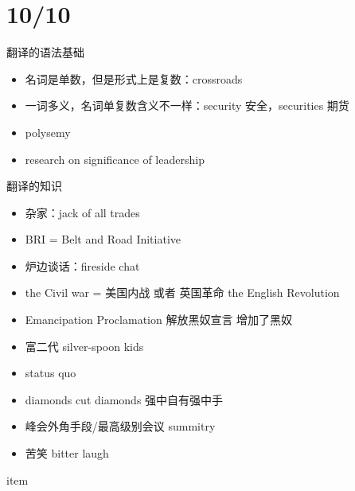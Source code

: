 \documentclass{ctexart}
\begin{document}
\section{10/10}
翻译的语法基础
\begin{itemize}
  \item 名词是单数，但是形式上是复数：crossroads 
  \item 一词多义，名词单复数含义不一样：security 安全，securities 期货
  \item polysemy
  \item research on significance of leadership
\end{itemize}
翻译的知识
\begin{itemize}
  \item 杂家：jack of all trades
  \item BRI = Belt and Road Initiative
  \item 炉边谈话：fireside chat
  \item the Civil war = 美国内战 或者 英国革命 the English Revolution
  \item Emancipation Proclamation 解放黑奴宣言 增加了黑奴
  \item 富二代 silver-spoon kids 
  \item status quo
  \item diamonds cut diamonds 强中自有强中手
  \item 峰会外角手段/最高级别会议 summitry
  \item 苦笑 bitter laugh
\end{itemize}

    item
\end{document}
